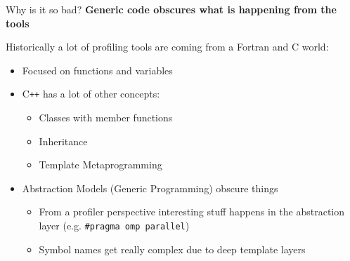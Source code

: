 \begin{frame}[fragile]{Why is it so bad?}
  \textbf{Generic code obscures what is happening from the tools}

  Historically a lot of profiling tools are coming from a Fortran and C world:

  \begin{itemize}
    \item Focused on functions and variables
    \item C\texttt{++} has a lot of other concepts:
    \begin{itemize}
      \item Classes with member functions
      \item Inheritance
      \item Template Metaprogramming
    \end{itemize}
    \item Abstraction Models (Generic Programming) obscure things
    \begin{itemize}
      \item From a profiler perspective interesting stuff happens in the abstraction layer (e.g. \texttt{\#pragma omp parallel})
      \item Symbol names get really complex due to deep template layers  
    \end{itemize}
  \end{itemize}

\end{frame}


